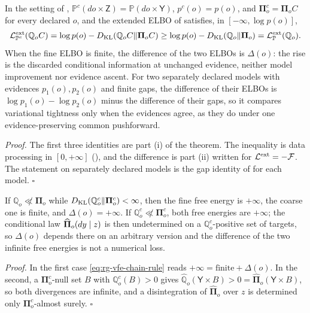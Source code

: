 \label{eq:cg-fixed-joint-pushforward}
In the setting of , $\mathbb P^c(do\times\mathsf Z)=\mathbb P(do\times\mathsf Y)$,
$p^c(o)=p(o)$, and $\boldsymbol\Pi^c_o=\boldsymbol\Pi_oC$ for every declared $o$, and the extended ELBO
of  satisfies, in $[-\infty,\log p(o)]$,
\begin{equation}
\mathcal L^{\mathrm{ext}}_{\mathbb P^c}(\mathbb Q_oC)
=\log p(o)-D_{\mathrm{KL}}(\mathbb Q_oC\Vert\boldsymbol\Pi_oC)
\geq\log p(o)-D_{\mathrm{KL}}(\mathbb Q_o\Vert\boldsymbol\Pi_o)
=\mathcal L^{\mathrm{ext}}_{\mathbb P}(\mathbb Q_o).
\label{eq:cg-elbo-monotone}
\end{equation}
When the fine ELBO is finite, the difference of the two ELBOs is $\Delta(o)$: the rise is the
discarded conditional information at unchanged evidence, neither model improvement nor evidence
ascent. For two separately declared models with evidences $p_1(o),p_2(o)$ and finite gaps, the
difference of their ELBOs is $\log p_1(o)-\log p_2(o)$ minus the difference of their gaps, so it
compares variational tightness only when the evidences agree, as they do under one
evidence-preserving common pushforward. 

\noindent\emph{Proof.}
The first three identities are part (i) of the theorem. The inequality is data processing in
$[0,+\infty]$ (), and the difference is part (ii) written for
$\mathcal L^{\mathrm{ext}}=-\mathcal F$. The statement on separately declared models is the gap identity
of  for each model. $\square$

If $\mathbb Q_o\not\ll\boldsymbol\Pi_o$ while $D_{\mathrm{KL}}(\mathbb Q^c_o\Vert\boldsymbol\Pi^c_o)<\infty$,
then the fine free energy is $+\infty$, the coarse one is finite, and $\Delta(o)=+\infty$. If
$\mathbb Q^c_o\not\ll\boldsymbol\Pi^c_o$, both free energies are $+\infty$; the conditional law
$\widehat{\boldsymbol\Pi}_o(dy\mid z)$ is then undetermined on a $\mathbb Q^c_o$-positive set of
targets, so $\Delta(o)$ depends there on an arbitrary version and the difference of the two
infinite free energies is not a numerical loss. 

\noindent\emph{Proof.}
In the first case \eqref{eq:rg-vfe-chain-rule} reads $+\infty=\text{finite}+\Delta(o)$. In the
second, a $\boldsymbol\Pi^c_o$-null set $B$ with $\mathbb Q^c_o(B)>0$ gives
$\widehat{\mathbb Q}_o(\mathsf Y\times B)>0=\widehat{\boldsymbol\Pi}_o(\mathsf Y\times B)$, so both
divergences are infinite, and a disintegration of $\widehat{\boldsymbol\Pi}_o$ over $z$ is
determined only $\boldsymbol\Pi^c_o$-almost surely. $\square$

